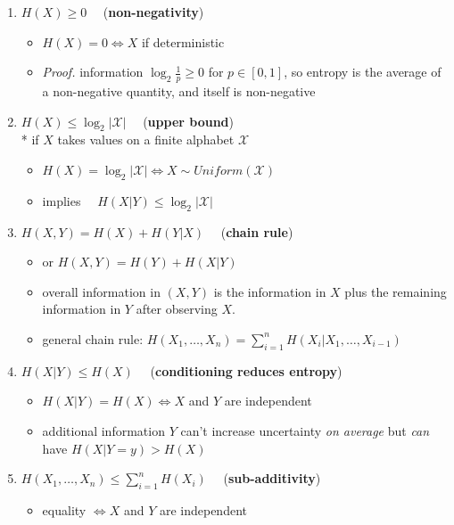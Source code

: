 \documentclass[10pt, landscape]{article}
\begin{document}
\begin{multicols*}{4}
  \begin{enumerate}
    \item $H(X) \geq 0 \quad$ (\textbf{non-negativity})
      \begin{itemize}
        \item $H(X)=0 \iff X$ if deterministic
        \item \textit{Proof.} information $\log_2\frac{1}{p} \geq 0$ for $p \in [0,1]$, so entropy is the average of a non-negative quantity, and itself is non-negative
      \end{itemize}
    \item $H(X) \leq \log_2 \vert\mathcal{X}\vert \quad$ (\textbf{upper bound}) \\* if $X$ takes values on a finite alphabet $ \mathcal{X} $
      \begin{itemize}
        \item $H(X) = \log_2\vert \mathcal{X}\vert \iff X\sim Uniform(\mathcal{X})$
        \item implies $\quad H(X \vert Y) \leq \log_2 \vert \mathcal{X} \vert$
      \end{itemize}
    \item $H(X, Y) = H(X) + H(Y\vert X) \quad$ (\textbf{chain rule})
      \begin{itemize}
        \item or $H(X, Y) = H(Y) + H(X\vert Y)$
        \item overall information in $(X, Y)$ is the information in $X$ plus the remaining information in $Y$ after observing $X$.
        \item general chain rule: $H(X_1, \dots, X_n) = \sum^n_{i=1} H(X_i \vert X_1, \dots, X_{i-1})$
      \end{itemize}
    \item $H(X \vert Y) \leq H(X) \quad$ (\textbf{conditioning reduces entropy})
      \begin{itemize}
        \item $H(X \vert Y) = H(X) \iff X$ and $Y$ are independent
        \item additional information $Y$ can't increase uncertainty \textit{on average}
          but \textit{can} have $H(X \vert Y=y) > H(X)$
      \end{itemize}
    \item $H(X_1, \dots, X_n) \leq \sum^n_{i=1} H(X_i) \quad$ (\textbf{sub-additivity})
      \begin{itemize}
        \item equality $\iff X$ and $Y$ are independent
      \end{itemize}
  \end{enumerate}


\end{multicols*}
\end{document}
